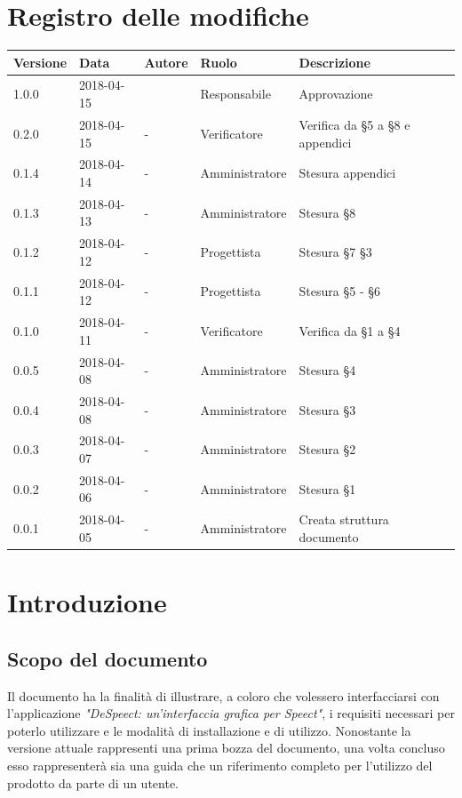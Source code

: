 \documentclass[openany,12pt,a4paper]{report}
\begin{document}
	\chapter*{Registro delle modifiche}
	\setlength\LTleft{-22mm}
	\begin{longtable}{|p{20mm}|p{20mm}|p{40mm}|p{30mm}|p{50mm}|}
		\hline
		\textbf{Versione} & \textbf{Data} & \textbf{Autore} & \textbf{Ruolo} & \textbf{Descrizione} \\
		
		\hline 1.0.0 & 2018-04-15 &  & Responsabile & Approvazione \\
		\hline 0.2.0 & 2018-04-15 & - & Verificatore & Verifica da §5 a §8 e appendici \\
		\hline 0.1.4 & 2018-04-14 & - & Amministratore & Stesura appendici \\
		\hline 0.1.3 & 2018-04-13 & - & Amministratore & Stesura §8 \\
		\hline 0.1.2 & 2018-04-12 & - & Progettista & Stesura §7 §3 \\		
		\hline 0.1.1 & 2018-04-12 & - & Progettista & Stesura §5 - §6 \\
		\hline 0.1.0 & 2018-04-11 & - & Verificatore & Verifica da §1 a §4 \\
		\hline 0.0.5 & 2018-04-08 & - & Amministratore & Stesura §4 \\	
		\hline 0.0.4 & 2018-04-08 & - & Amministratore & Stesura §3 \\
		\hline 0.0.3 & 2018-04-07 & - & Amministratore & Stesura §2 \\
		\hline 0.0.2 & 2018-04-06 & - & Amministratore & Stesura §1 \\
		\hline 0.0.1 & 2018-04-05 & - & Amministratore & Creata struttura documento \\
		\hline
		
	\end{longtable}
	
	\tableofcontents
	
	
	\chapter{Introduzione}
	
	\section{Scopo del documento}
	
	Il documento ha la finalità di illustrare, a coloro che volessero interfacciarsi con l’applicazione
	\textit{"DeSpeect: un'interfaccia grafica per Speect"}, i requisiti necessari per poterlo utilizzare e le modalità di installazione e di utilizzo. 
	Nonostante la versione attuale rappresenti una prima bozza del documento, una volta concluso esso rappresenterà sia una guida che un riferimento completo per l’utilizzo del prodotto da parte di un utente.
	
\end{document}

